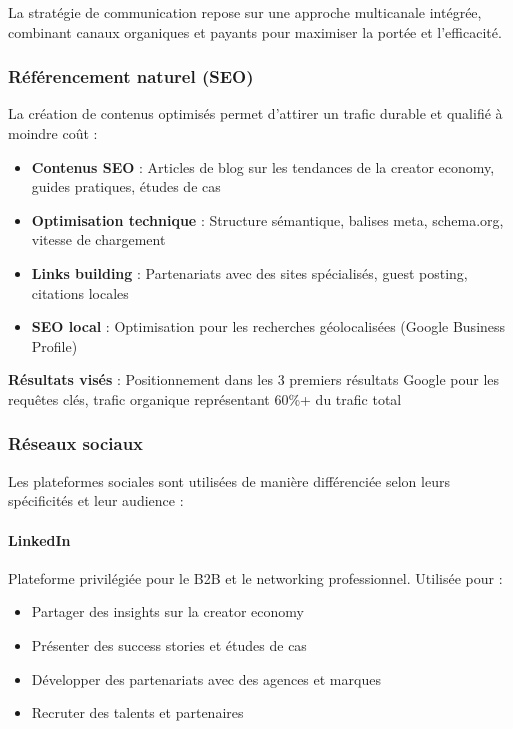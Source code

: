 La stratégie de communication repose sur une approche multicanale intégrée, combinant canaux organiques et payants pour maximiser la portée et l'efficacité.

\subsubsection{Référencement naturel (SEO)}

La création de contenus optimisés permet d'attirer un trafic durable et qualifié à moindre coût :

\begin{itemize}
    \item \textbf{Contenus SEO} : Articles de blog sur les tendances de la creator economy, guides pratiques, études de cas
    \item \textbf{Optimisation technique} : Structure sémantique, balises meta, schema.org, vitesse de chargement
    \item \textbf{Links building} : Partenariats avec des sites spécialisés, guest posting, citations locales
    \item \textbf{SEO local} : Optimisation pour les recherches géolocalisées (Google Business Profile)
\end{itemize}

\textbf{Résultats visés} : Positionnement dans les 3 premiers résultats Google pour les requêtes clés, trafic organique représentant 60\%+ du trafic total

\subsubsection{Réseaux sociaux}

Les plateformes sociales sont utilisées de manière différenciée selon leurs spécificités et leur audience :

\paragraph{LinkedIn}

Plateforme privilégiée pour le B2B et le networking professionnel. Utilisée pour :
\begin{itemize}
    \item Partager des insights sur la creator economy
    \item Présenter des success stories et études de cas
    \item Développer des partenariats avec des agences et marques
    \item Recruter des talents et partenaires
\end{itemize}

